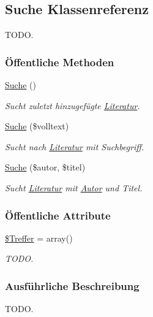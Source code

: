 \hypertarget{classSuche}{
\subsection{Suche Klassenreferenz}
\label{classSuche}
}
TODO.  


\subsubsection*{\"{O}ffentliche Methoden}
\begin{CompactItemize}
\item 
\hyperlink{classSuche_e863aff1c9abcb0308d5d3fdcdebb968}{Suche} ()
\begin{CompactList}\small\item\em Sucht zuletzt hinzugefügte \hyperlink{classLiteratur}{Literatur}. \item\end{CompactList}\item 
\hyperlink{classSuche_05639fec18bd3193c01aafb08208ec94}{Suche} (\$volltext)
\begin{CompactList}\small\item\em Sucht nach \hyperlink{classLiteratur}{Literatur} mit Suchbegriff. \item\end{CompactList}\item 
\hyperlink{classSuche_4158769424a462492ac7821a0a30cf08}{Suche} (\$autor, \$titel)
\begin{CompactList}\small\item\em Sucht \hyperlink{classLiteratur}{Literatur} mit \hyperlink{classAutor}{Autor} und Titel. \item\end{CompactList}\end{CompactItemize}
\subsubsection*{\"{O}ffentliche Attribute}
\begin{CompactItemize}
\item 
\hyperlink{classSuche_0ee0e1ffb3f79392915fd39934d7140d}{\$Treffer} = array()
\begin{CompactList}\small\item\em TODO. \item\end{CompactList}\end{CompactItemize}


\subsubsection{Ausf\"{u}hrliche Beschreibung}
TODO. 

